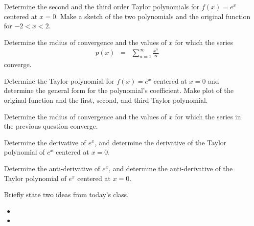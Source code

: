 
\begin{problem}
\item Determine the second and the third order Taylor polynomials for
  $f(x)=e^x$ centered at $x=0$. Make a sketch of the two polynomials
  and the original function for $-2 < x < 2$.

  \vfill

  \clearpage

\item Determine the radius of convergence and the values of $x$ for
  which the series
  \begin{eqnarray*}
    p(x) & = & \sum^\infty_{n=1} \frac{x^n}{n}
  \end{eqnarray*}
  converge.

  \vfill

\end{problem}


\begin{problem}
\item Determine the Taylor polynomial for $f(x)=e^x$ centered at $x=0$
  and determine the general form for the polynomial's coefficient.
  Make plot of the original function and the first, second, and third Taylor polynomial.

  \vfill


  \clearpage

\item Determine the radius of convergence and the values of $x$ for
  which the series in the previous question converge.

  \vfill


  \clearpage

\item Determine the derivative of $e^x$, and determine the derivative of the Taylor
polynomial of $e^x$ centered at $x=0$.
  \vfill

  \clearpage

  \item Determine the anti-derivative of $e^x$, and determine the anti-derivative of the Taylor
  polynomial of $e^x$ centered at $x=0$.
    \vfill

\end{problem}


\postClass

\begin{problem}
\item Briefly state two ideas from today's class.
  \begin{itemize}
  \item
  \item
  \end{itemize}
\item
  \begin{subproblem}
    \item
  \end{subproblem}
\end{problem}




